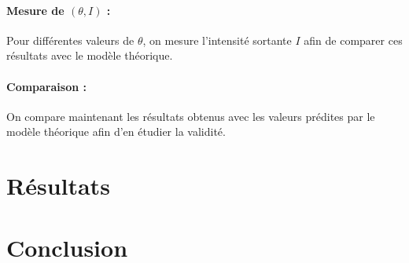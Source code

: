 \documentclass[french]{article}
\begin{document}
\paragraph{Mesure de $(\theta, I)$ :} Pour différentes valeurs de $\theta$, on mesure l'intensité sortante $I$ afin de comparer ces résultats avec le modèle théorique.

\paragraph{Comparaison :} On compare maintenant les résultats obtenus avec les valeurs prédites par le modèle théorique afin d'en étudier la validité.

\section{Résultats}

\section{Conclusion}
\end{document}
